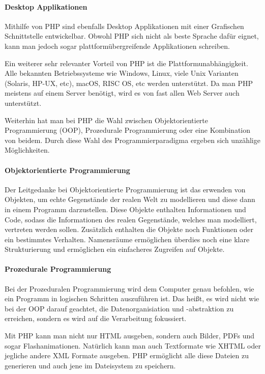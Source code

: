\paragraph{Desktop Applikationen} Mithilfe von PHP sind ebenfalls Desktop Applikationen mit einer Grafischen Schnittstelle entwickelbar. Obwohl PHP sich nicht als beste Sprache dafür eignet, kann man jedoch sogar plattformübergreifende Applikationen schreiben.

Ein weiterer sehr relevanter Vorteil von PHP ist die Plattformunabhängigkeit. Alle bekannten Betriebssysteme wie Windows, Linux, viele Unix Varianten (Solaris, HP-UX, etc), macOS, RISC OS, etc werden unterstützt. Da man PHP meistens auf einem Server benötigt, wird es von fast allen Web Server auch unterstützt. 

Weiterhin hat man bei PHP die Wahl zwischen Objektorientierte Programmierung (OOP), Prozedurale Programmierung oder eine Kombination von beidem. Durch diese Wahl des Programmierparadigma ergeben sich unzählige Möglichkeiten.

\paragraph{Objektorientierte Programmierung}

Der Leitgedanke bei Objektorientierte\cite{OOP} Programmierung ist das erwenden von Objekten, um echte Gegenstände der realen Welt zu modellieren und diese dann in einem Programm darzustellen. Diese Objekte enthalten Informationen und Code, sodass die Informationen des realen Gegenstände, welches man modelliert, vertreten werden sollen. Zusätzlich enthalten die Objekte noch Funktionen oder ein bestimmtes Verhalten. Namensräume ermöglichen überdies noch eine klare Strukturierung und ermöglichen ein einfacheres Zugreifen auf Objekte. 

\paragraph{Prozedurale Programmierung}

Bei der Prozeduralen\cite{OOPvsProcedural} Programmierung wird dem Computer genau befohlen, wie ein Programm in logischen Schritten auszuführen ist. Das heißt, es wird nicht wie bei der OOP darauf geachtet, die Datenorganisiation und -abstraktion zu erreichen, sondern es wird auf die Verarbeitung fokussiert.


Mit PHP kann man nicht nur HTML ausgeben, sondern auch Bilder, PDFs und sogar Flashanimationen. Natürlich kann man auch Textformate wie XHTML oder jegliche andere XML Formate ausgeben. PHP ermöglicht alle diese Dateien zu generieren und auch jene im Dateisystem zu speichern.

